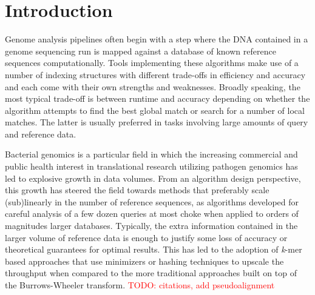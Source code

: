 \documentclass[unnumsec,webpdf,contemporary,large]{oup-authoring-template}%
\theoremstyle{thmstyleone}%
\theoremstyle{thmstyletwo}%
\theoremstyle{thmstylethree}%
\begin{document}

\maketitle


\section{Introduction}
Genome analysis pipelines often begin with a step where the DNA contained in a genome sequencing run is mapped against a database of known reference sequences computationally. Tools implementing these algorithms make use of a number of indexing structures with different trade-offs in efficiency and accuracy and each come with their own strengths and weaknesses. Broadly speaking, the most typical trade-off is between runtime and accuracy depending on whether the algorithm attempts to find the best global match or search for a number of local matches. The latter is usually preferred in tasks involving large amounts of query and reference data.

Bacterial genomics is a particular field in which the increasing commercial and public health interest in translational research utilizing pathogen genomics has led to explosive growth in data volumes. From an algorithm design perspective, this growth has steered the field towards methods that preferably scale (sub)linearly in the number of reference sequences, as algorithms developed for careful analysis of a few dozen queries at most choke when applied to orders of magnitudes larger databases. Typically, the extra information contained in the larger volume of reference data is enough to justify some loss of accuracy or theoretical guarantees for optimal results. This has led to the adoption of \emph{k}-mer based approaches that use minimizers or hashing techniques to upscale the throughput when compared to the more traditional approaches built on top of the Burrows-Wheeler transform. \textcolor{red}{TODO: citations, add pseudoalignment}
\end{document}
